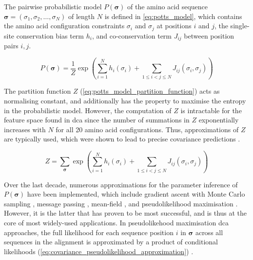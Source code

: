 The pairwise probabilistic model $P(\boldsymbol{\sigma})$ of the amino acid sequence $\boldsymbol{\sigma}=\left(\sigma_1,\sigma_2,\dots,\sigma_N\right)$ of length $N$ is defined in \cref{eq:potts_model}, which contains the amino acid configuration constraints $\sigma_i$ and $\sigma_j$ at positions $i$ and $j$, the single-site conservation bias term $h_i$, and co-conservation term $J_{ij}$ between position pairs $i,j$. 

\begin{equation}
    P(\boldsymbol{\sigma})=\frac{1}{Z}\exp\left(\sum_{i=1}^{N}h_i\left(\sigma_i\right)+\sum_{1 \leqslant i < j \leqslant N}J_{ij}\left(\sigma_i, \sigma_j\right)\right)
    \label{eq:potts_model}
\end{equation}

The partition function $Z$ (\cref{eq:potts_model_partition_function}) acts as normalising constant, and additionally has the property to maximise the entropy in the probabilistic model. However, the computation of $Z$ is intractable for the feature space found in \gls{dca} since the number of summations in $Z$ exponentially increases with $N$ for all 20 amino acid configurations. Thus, approximations of $Z$ are typically used, which were shown to lead to precise covariance predictions \cite{Ekeberg2013-ay}.

\begin{equation}
    Z=\sum_{\boldsymbol{\sigma}}^{ }\exp\left(\sum_{i=1}^{N}h_i\left(\sigma_i\right)+\sum_{1 \leqslant i < j \leqslant N}J_{ij}\left(\sigma_i, \sigma_j\right)\right)
    \label{eq:potts_model_partition_function}
\end{equation}

Over the last decade, numerous approximations for the parameter inference of $P(\boldsymbol{\sigma})$ have been implemented, which include gradient ascent with Monte Carlo sampling \cite{Lapedes2012-tu}, message passing \cite{Weigt2009-sx}, mean-field \cite{Marks2011-os,Morcos2011-lk,Jones2012-ks,Stein2015-cw}, and pseudolikelihood maximisation \cite{Balakrishnan2011-wh,Ekeberg2013-ay,Kamisetty2013-le,Seemayer2014-zp,Hopf2015-vf}. However, it is the latter that has proven to be most successful, and is thus at the core of most widely-used applications. In pseudolikehood maximisation \gls{dca} approaches, the full likelihood for each sequence position $i$ in $\boldsymbol{\sigma}$ across all sequences in the alignment is approximated by a product of conditional likelihoods (\cref{eq:covariance_pseudolikelihood_approximation}) \cite{Hopf2017-pp}.

